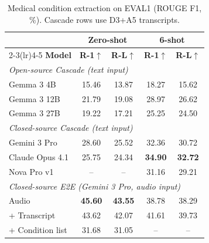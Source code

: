 \documentclass{article}
\begin{document}
\begin{table}[H]
  \centering
  \caption{Medical condition extraction on EVAL1 (ROUGE F1, \%). Cascade rows use D3+A5 transcripts.}
  \label{tab:extract}
  \vspace{1mm}
  \setlength{\tabcolsep}{5.5pt}
  \begin{tabular}{l cc cc}
    \toprule
    & \multicolumn{2}{c}{\textbf{Zero-shot}} & \multicolumn{2}{c}{\textbf{6-shot}} \\
    \cmidrule(lr){2-3}\cmidrule(lr){4-5}
    \textbf{Model} & \textbf{R-1}$\uparrow$ & \textbf{R-L}$\uparrow$ & \textbf{R-1}$\uparrow$ & \textbf{R-L}$\uparrow$ \\
    \midrule
    \multicolumn{5}{l}{\textit{Open-source Cascade (text input)}} \\
    \;\;\;Gemma 3 4B  & 15.46 & 13.87 & 18.27 & 15.62 \\
    \;\;\;Gemma 3 12B & 21.79 & 19.08 & 28.97 & 26.62 \\
    \;\;\;Gemma 3 27B & 19.22 & 17.21 & 25.25 & 24.50 \\
    \midrule
    \multicolumn{5}{l}{\textit{Closed-source Cascade (text input)}} \\
    \;\;\;Gemini 3 Pro        & 28.60 & 25.52 & 32.36 & 30.72 \\
    \;\;\;Claude Opus 4.1     & 25.75 & 24.34 & \textbf{34.90} & \textbf{32.72} \\
    \;\;\;Nova Pro v1         & --    & --    & 31.16 & 29.21 \\
    \midrule
    \multicolumn{5}{l}{\textit{Closed-source E2E (Gemini 3 Pro, audio input)}} \\
    \;\;\;Audio               & \textbf{45.60} & \textbf{43.55} & 38.78 & 38.29 \\
    \;\;\;\;\;\; + Transcript  & 43.62 & 42.07 & 41.61 & 39.73 \\
    \;\;\;\;\;\; + Condition list & 31.68 & 31.05 & -- & -- \\
    \bottomrule
  \end{tabular}
\end{table}
\end{document}
